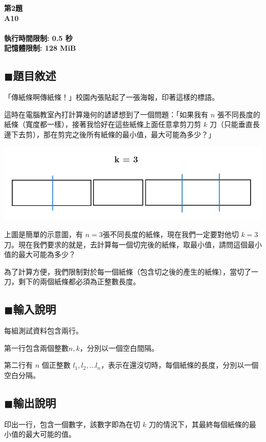 \documentclass[12pt,a4paper]{article}
\begin{document}
\newpage

\begin{center}
\textbf{{\Huge 第2題\\A10\\}~\\執行時間限制: 0.5 秒\\記憶體限制: 128 MiB}
\end{center}


\subsection*{$\blacksquare$題目敘述}

「傳紙條啊傳紙條！」校園內張貼起了一張海報，印著這樣的標語。

這時在電腦教室內打計算幾何的諺諺想到了一個問題：「如果我有 $n$ 張不同長度的紙條（寬度都一樣），接著我恰好在這些紙條上面任意拿剪刀剪 $k$ 刀（只能垂直長邊下去剪），那在剪完之後所有紙條的最小值，最大可能為多少？」

\begin{center}
\includegraphics[scale=0.5]{2-1.jpg}
\end{center}

上圖是簡單的示意圖，有 $n = 3$張不同長度的紙條，現在我們一定要對他切 $k = 3$ 刀。現在我們要求的就是，去計算每一個切完後的紙條，取最小值，請問這個最小值的最大可能為多少？

為了計算方便，我們限制對於每一個紙條（包含切之後的產生的紙條），當切了一刀，剩下的兩個紙條都必須為正整數長度。

\subsection*{$\blacksquare$輸入說明}
每組測試資料包含兩行。\par
第一行包含兩個整數\(n,k\)，分別以一個空白間隔。\par
第二行有 $n$ 個正整數 $l_1, l_2, ... l_n$，表示在還沒切時，每個紙條的長度，分別以一個空白分隔。\par

\subsection*{$\blacksquare$輸出說明}
印出一行，包含一個數字，該數字即為在切 $k$ 刀的情況下，其最終每個紙條的最小值的最大可能的值。\par
\end{document}
